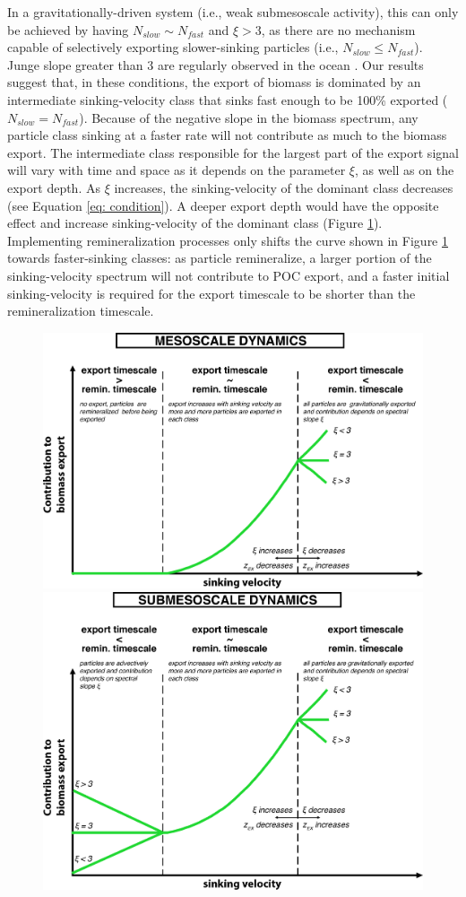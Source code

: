 \documentclass[draft,linenumbers]{agujournal2018}
\begin{document}
In a gravitationally-driven system (i.e., weak submesoscale activity), this can only be achieved by having  $N_{slow} \sim N_{fast}$ and $\xi>3$, as there are no mechanism capable of selectively exporting slower-sinking particles (i.e., $N_{slow} \leq N_{fast}$). Junge slope greater than 3 are regularly observed in the ocean \citep{Kostadinov_2009, White_2015}. Our results suggest that, in these conditions, the export of biomass is dominated by an intermediate sinking-velocity class that sinks fast enough to be 100\% exported ($N_{slow} = N_{fast}$). Because of the negative slope in the biomass spectrum, any particle class sinking at a faster rate will not contribute as much to the biomass export. The intermediate class responsible for the largest part of the export signal will vary with time and space as it depends on the parameter $\xi$, as well as on the export depth. As $\xi$ increases, the sinking-velocity of the dominant class decreases (see Equation \ref{eq: condition}). A deeper export depth would have the opposite effect and increase sinking-velocity of the dominant class (Figure \ref{fig: export_cartoon}). Implementing remineralization processes only shifts the curve shown in Figure \ref{fig: export_cartoon} towards faster-sinking classes: as particle remineralize, a larger portion of the sinking-velocity spectrum will not contribute to POC export, and a faster initial sinking-velocity is required for the export timescale to be shorter than the remineralization timescale.

 \begin{figure}[ht!]
	\centering
	\includegraphics[width = .6\linewidth]{figures/cartoon_meso}\\[.2cm]
	\includegraphics[width = .6\linewidth]{figures/cartoon_submeso}
	\caption{}
	\label{fig: export_cartoon}
\end{figure}
\end{document}

